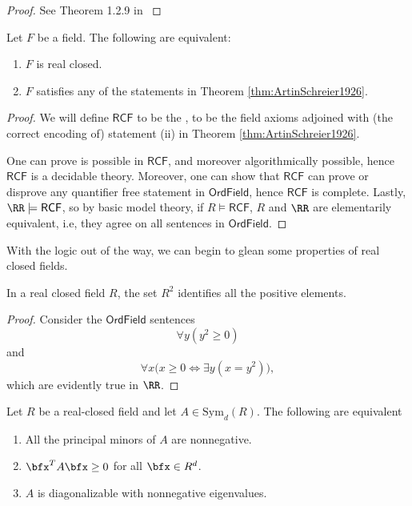 \documentclass{article}
\newcommand*\Sym{\mathrm{Sym}}
\newcommand*\RCF{\mathsf{RCF}}
\newcommand*\OrdField{\mathsf{OrdField}}
\begin{document}
\begin{proof}
    See Theorem 1.2.9 in \cite{NetzerRAG}
\end{proof}


\begin{theorem}
    [Tarski 19??]
    Let $F$ be a field.
    The following are equivalent:
    \begin{enumerate}[label=(\roman*)]
        \item 
            $F$ is real closed.
        \item 
            $F$ satisfies any of the statements in Theorem \ref{thm:ArtinSchreier1926}.
    \end{enumerate}
\end{theorem}

\begin{proof}
    We will define $\RCF$ to be the , to be the field axioms adjoined with (the correct encoding of) statement (ii) in Theorem \ref{thm:ArtinSchreier1926}.

    One can prove  is possible in $\RCF$, and moreover algorithmically possible, hence $\RCF$ is a decidable theory.
    Moreover, one can show that $\RCF$ can prove or disprove any quantifier free statement in $\OrdField$, hence $\RCF$ is complete.
    Lastly, $\RR \models \RCF$, so by basic model theory, if $R \models \RCF$, $R$ and $\RR$ are elementarily equivalent, i.e, they agree on all sentences in $\OrdField$.
\end{proof}

With the logic out of the way, we can begin to glean some properties of real closed fields.

\begin{proposition}
    [The ordering on $\RCF$s]
    \label{thm:RCFOrder}
    In a real closed field $R$, the set $R^2$ identifies all the positive elements.
\end{proposition}

\begin{proof}
    Consider the $\OrdField$ sentences
    \[
        \forall y (y^2 \geq 0)
    \]
    and
    \[
        \forall x \Big(x \geq 0 \iff \exists y (x = y^2)\Big),
    \]
    which are evidently true in $\RR$.
\end{proof}

\begin{proposition}
    \label{prop:RCFpsd}
    Let $R$ be a real-closed field and let $A \in \Sym_d(R)$.
    The following are equivalent
    \begin{enumerate}[label=(\roman*)]
        \item 
            All the principal minors of $A$ are nonnegative.
        \item 
            $\bfx^T A \bfx \geq 0$ for all $\bfx \in R^d$.
        \item 
            $A$ is diagonalizable with nonnegative eigenvalues.
    \end{enumerate}
\end{proposition}
\end{document}
